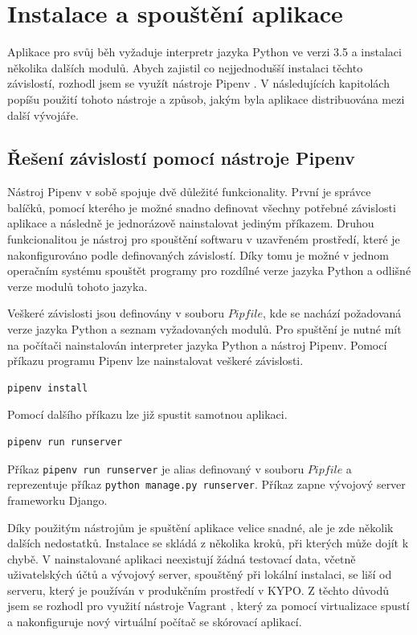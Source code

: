 \documentclass[
  digital,
  twoside,
  table, 
  nolof, 
  nolot
]{fithesis3}
\begin{document}
\section{Instalace a spouštění aplikace}
Aplikace pro svůj běh vyžaduje interpretr jazyka Python ve verzi 3.5 a instalaci několika dalších modulů. Abych zajistil co nejjednodušší instalaci těchto závislostí, rozhodl jsem se využít nástroje Pipenv \cite{pipenv}. V následujících kapitolách popíšu použití tohoto nástroje a způsob, jakým byla aplikace distribuována mezi další vývojáře.

\subsection{Řešení závislostí pomocí nástroje Pipenv}
Nástroj Pipenv v sobě spojuje dvě důležité funkcionality. První je správce balíčků, pomocí kterého je možné snadno definovat všechny potřebné závislosti aplikace a následně je jednorázově nainstalovat jediným příkazem. Druhou funkcionalitou je nástroj pro spouštění softwaru v uzavřeném prostředí, které je nakonfigurováno podle definovaných závislostí. Díky tomu je možné v jednom operačním systému spouštět programy pro rozdílné verze jazyka Python a odlišné verze modulů tohoto jazyka.

Veškeré závislosti jsou definovány v souboru $Pipfile$, kde se nachází požadovaná verze jazyka Python a seznam vyžadovaných modulů. Pro spuštění je nutné mít na počítači nainstalován interpreter jazyka Python a nástroj Pipenv. Pomocí příkazu programu Pipenv lze nainstalovat veškeré závislosti.

\begin{lstlisting}
pipenv install
\end{lstlisting}

Pomocí dalšího příkazu lze již spustit samotnou aplikaci.

\begin{lstlisting}
pipenv run runserver
\end{lstlisting}

Příkaz \lstinline[columns=fixed]{pipenv run runserver} je alias definovaný v souboru $Pipfile$ a reprezentuje příkaz \lstinline[columns=fixed]{python manage.py runserver}. Příkaz zapne vývojový server frameworku Django.

Díky použitým nástrojům je spuštění aplikace velice snadné, ale je zde několik dalších nedostatků. Instalace se skládá z několika kroků, při kterých může dojít k chybě. V nainstalované aplikaci neexistují žádná testovací data, včetně uživatelských účtů a vývojový server, spouštěný při lokální instalaci, se liší od serveru, který je používán v produkčním prostředí v KYPO. Z těchto důvodů jsem se rozhodl pro využití nástroje Vagrant \cite{vagrant}, který za pomocí virtualizace spustí a nakonfiguruje nový virtuální počítač se skórovací aplikací.
\end{document}
